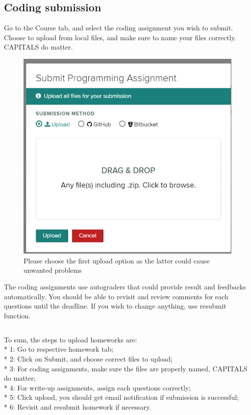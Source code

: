 \documentclass{article}
\begin{document}
\subsection{Coding submission}
\hspace{\parindent}Go to the Course tab, and select the coding assignment you wish to submit.
Choose to upload from local files, and make sure to name your files correctly. CAPITALS do matter.
\begin{figure}[H]
\centerline{\includegraphics[scale=.5]{submit_3.png}}
\caption{Please choose the first upload option as the latter could cause unwanted problems}
\label{fig}
\end{figure}
The coding assignments use autograders that could provide result and feedbacks automatically.
You should be able to revisit and review comments for each questions until the deadline.
If you wish to change anything, use resubmit function.
\subsection{}
To sum, the steps to upload homeworks are:\\*
1: Go to respective homework tab;\\*
2: Click on Submit, and choose correct files to upload;\\*
3: For coding assignments, make sure the files are properly named, CAPITALS do matter;\\*
4: For write-up assignments, assign each questions correctly;\\*
5: Click upload, you should get email notification if submission is successful;\\*
6: Revisit and resubmit homework if necessary.
\end{document}
